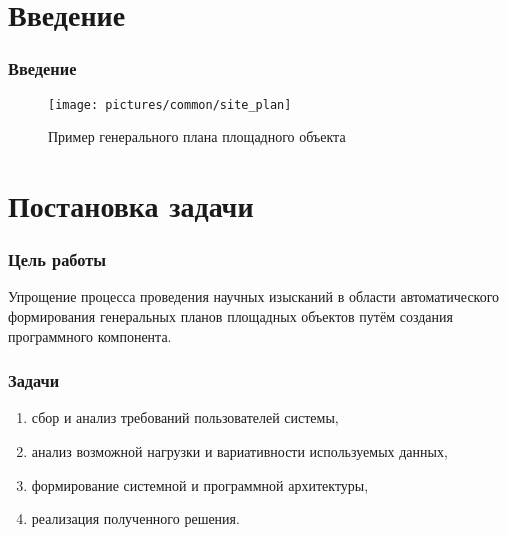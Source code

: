 \section{Введение}

\begin{frame}
\frametitle{Введение}
\begin{figure}
    \texttt{[image: pictures/common/site\_plan]}
    \caption{Пример генерального плана площадного объекта}
\end{figure}
\end{frame}


\section{Постановка задачи}

\begin{frame}
\frametitle{Цель работы}
Упрощение процесса проведения научных изысканий
в области автоматического формирования генеральных планов площадных объектов
путём создания программного компонента.
\end{frame}


\begin{frame}
\frametitle{Задачи}
\begin{enumerate}
    \item сбор и анализ требований пользователей системы,
    \item анализ возможной нагрузки и вариативности используемых данных,
    \item формирование системной и программной архитектуры,
    \item реализация полученного решения.
\end{enumerate}
\end{frame}
